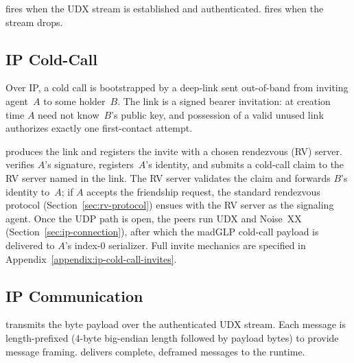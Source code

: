  fires when the UDX stream is established and authenticated.  fires when the stream drops.

\subsection{IP Cold-Call}
\label{sec:ip-cold-call}

Over IP, a cold call is bootstrapped by a deep-link sent out-of-band from inviting agent~$A$ to some holder~$B$.  The link is a signed bearer invitation: at creation time $A$ need not know~$B$'s public key, and possession of a valid unused link authorizes exactly one first-contact attempt.

 produces the link and registers the invite with a chosen rendezvous (RV) server.  verifies $A$'s signature, registers~$A$'s identity, and submits a cold-call claim to the RV server named in the link.  The RV server validates the claim and forwards $B$'s identity to~$A$; if $A$ accepts the friendship request, the standard rendezvous protocol (Section~\ref{sec:rv-protocol}) ensues with the RV server as the signaling agent.  Once the UDP path is open, the peers run UDX and Noise~XX (Section~\ref{sec:ip-connection}), after which the madGLP cold-call payload is delivered to $A$'s index-0 serializer.  Full invite mechanics are specified in Appendix~\ref{appendix:ip-cold-call-invites}.

\subsection{IP Communication}
\label{sec:ip-comm}
 transmits the byte payload over the authenticated UDX stream. Each message is length-prefixed (4-byte big-endian length followed by payload bytes) to provide message framing.  delivers complete, deframed messages to the runtime.
